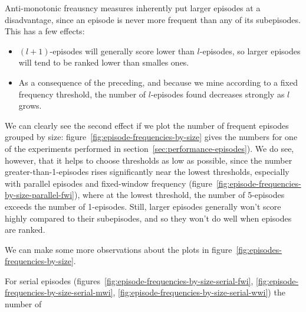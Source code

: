 Anti-monotonic freausncy measures inherently put larger episodes at a disadvantage, since an episode is never more frequent than any of its subepisodes. This has a few effects:
\begin{itemize}
\item $ (l + 1) $-episodes will generally score lower than $ l $-episodes, so larger episodes will tend to be ranked lower than smalles ones.
\item As a consequence of the preceding, and because we mine according to a fixed frequency threshold, the number of $ l $-episodes found decreases strongly as $ l $ grows.
\end{itemize}
We can clearly see the second effect if we plot the number of frequent episodes grouped by size: figure~\ref{fig:episode-frequencies-by-size} gives the numbers for one of the experiments performed in section~\ref{sec:performance-episodes}). We do see, however, that it helps to choose thresholds as low as possible, since the number greater-than-1-episodes rises significantly near the lowest thresholds, especially with parallel episodes and fixed-window frequency (figure~\ref{fig:episode-frequencies-by-size-parallel-fwi}), where at the lowest threshold, the number of 5-episodes exceeds the number of 1-episodes. Still, larger episodes generally won't score highly compared to their subepisodes, and so they won't do well when episodes are ranked.


We can make some more observations about the plots in figure~\ref{fig:episodes-frequencies-by-size}. %

For serial episodes (figures~\ref{fig:episode-frequencies-by-size-serial-fwi}, \ref{fig:episode-frequencies-by-size-serial-mwi}, \ref{fig:episode-frequencies-by-size-serial-wwi}) the number of %

